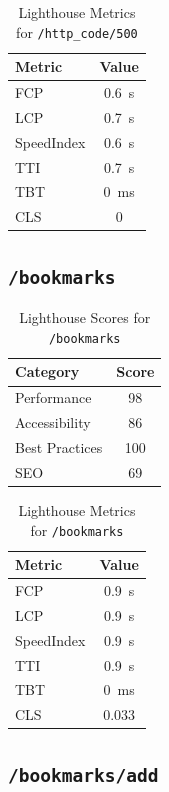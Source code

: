 \begin{table}[H]
  \centering
  \caption{Lighthouse Metrics for \texttt{/http\_code/500}}
  \begin{tabular}{|l|c|}
    \hline
    Metric & Value \\ \hline
    FCP & 0.6 s \\ \hline
    LCP & 0.7 s \\ \hline
    SpeedIndex & 0.6 s \\ \hline
    TTI & 0.7 s \\ \hline
    TBT & 0 ms \\ \hline
    CLS & 0 \\ \hline
  \end{tabular}
\end{table}
\subsection{\texttt{/bookmarks}}

\begin{table}[H]
  \centering
  \caption{Lighthouse Scores for \texttt{/bookmarks}}
  \begin{tabular}{|l|c|}
    \hline
    Category & Score \\ \hline
    Performance & 98 \\ \hline
    Accessibility & 86 \\ \hline
    Best Practices & 100 \\ \hline
    SEO & 69 \\ \hline
  \end{tabular}
\end{table}

\begin{table}[H]
  \centering
  \caption{Lighthouse Metrics for \texttt{/bookmarks}}
  \begin{tabular}{|l|c|}
    \hline
    Metric & Value \\ \hline
    FCP & 0.9 s \\ \hline
    LCP & 0.9 s \\ \hline
    SpeedIndex & 0.9 s \\ \hline
    TTI & 0.9 s \\ \hline
    TBT & 0 ms \\ \hline
    CLS & 0.033 \\ \hline
  \end{tabular}
\end{table}
\subsection{\texttt{/bookmarks/add}}

